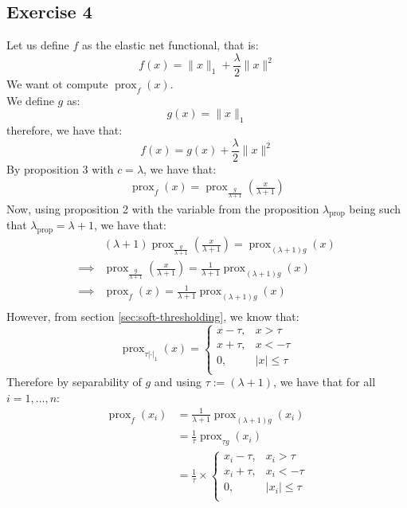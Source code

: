 \documentclass[12pt]{article}
\newcommand{\prox}{\operatorname{prox}}
\begin{document}
\subsection{Exercise 4}
Let us define $f$ as the elastic net functional, that is:
\begin{equation*}
  f(x) = \|x\|_1 + \frac{\lambda}{2}\|x\|^2
\end{equation*}
We want ot compute $\prox_{f}(x)$. \\
We define $g$ as:
\begin{equation*}
  g(x) = \| x \|_1
\end{equation*}
therefore, we have that:
\begin{equation*}
  f(x) = g(x) + \frac{\lambda}{2}\|x\|^2
\end{equation*}
By proposition 3 with $c = \lambda$, we have that:
\begin{align*}
  \prox_{f}(x) = \prox_{\frac{g}{\lambda + 1}} \left( \frac{x}{\lambda + 1}\right)
\end{align*}
Now, using proposition 2 with the variable from the proposition $\lambda_{\text{prop}}$ being such that $\lambda_{\text{prop}} = \lambda + 1$, we have that:
\begin{align*}
           &
  (\lambda + 1) \prox_{\frac{g}{\lambda + 1}} \left( \frac{x}{\lambda + 1}\right) = \prox_{(\lambda + 1) g} \left( x \right)         \\
  \implies &
  \prox_{\frac{g}{\lambda + 1}} \left( \frac{x}{\lambda + 1}\right) = \frac{1}{\lambda + 1} \prox_{(\lambda + 1) g} \left( x \right) \\
  \implies &
  \prox_{f} \left( x \right) = \frac{1}{\lambda + 1} \prox_{(\lambda + 1) g} \left( x \right)                                        \\
\end{align*}
However, from section \ref{sec:soft-thresholding}, we know that:
\begin{equation*}
  \prox_{\tau |\cdot|_1} (x)
  = \begin{cases}
    x - \tau, & x > \tau      \\
    x + \tau, & x < -\tau     \\
    0,        & |x| \leq \tau \\
  \end{cases}
\end{equation*}
Therefore by separability of $g$ and using $\tau := (\lambda + 1)$, we have that for all $i = 1, \ldots, n$:
\begin{align*}
  \prox_{f} \left( x_i \right)
   & = \frac{1}{\lambda + 1} \prox_{(\lambda + 1) g} \left( x_i \right) \\
   & = \frac{1}{\tau} \prox_{\tau g} \left( x_i \right)                 \\
   & = \frac{1}{\tau} \times
  \begin{cases}
    x_i - \tau, & x_i > \tau      \\
    x_i + \tau, & x_i < -\tau     \\
    0,          & |x_i| \leq \tau \\
  \end{cases}                                            \\
\end{align*}
\end{document}
